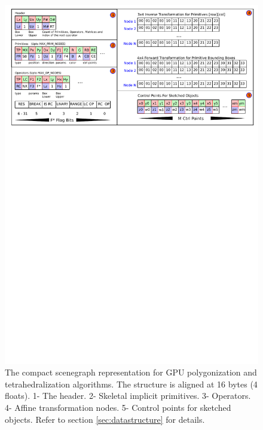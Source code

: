 \begin{figure}[H]
  \centering
  \includegraphics[width=1.0\linewidth]{figures/gpupoly/lineartree.pdf}
  \caption{\label{fig:datastructure}
  {The compact \blob scenegraph representation for GPU polygonization and tetrahedralization algorithms. The structure is aligned at 16 bytes (4 floats). 
  1- The header. 2- Skeletal implicit primitives. 3- Operators. 4- Affine transformation nodes. 5- Control points for sketched objects. Refer to section 
  \ref{sec:datastructure} for details.}
}
\end{figure}

